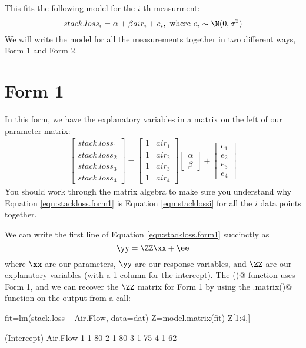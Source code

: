 This fits the following model for the $i$-th measurment:
\begin{equation}\label{eqn:stacklossi}
stack.loss_i = \alpha + \beta air_i + e_i, \text{ where } e_i \sim \N(0,\sigma^2) 
\end{equation}
We will write the model for all the measurements together in two different ways, Form 1 and Form 2.

\section{Form 1}
In this form, we have the explanatory variables in a matrix on the left of our parameter matrix:
\begin{equation}\label{eqn:stackloss.form1}
\begin{gathered}
\begin{bmatrix}stack.loss_1\\stack.loss_2\\stack.loss_3\\stack.loss_4\end{bmatrix}
= 
\begin{bmatrix}1&air_1\\1&air_2\\1&air_3\\1&air_4\end{bmatrix}
\begin{bmatrix}\alpha\\ \beta\end{bmatrix}
+
\begin{bmatrix}e_1\\e_2\\e_3\\e_4\end{bmatrix}
\end{gathered}
\end{equation}
You should work through the matrix algebra to make sure you understand why Equation \ref{eqn:stackloss.form1} is Equation \ref{eqn:stacklossi} for all the $i$ data points together.


We can write the first line of Equation \ref{eqn:stackloss.form1} succinctly as
\begin{equation}
\yy = \ZZ\xx + \ee
\end{equation}
where $\xx$ are our parameters, $\yy$ are our response variables, and $\ZZ$ are our explanatory variables (with a 1 column for the intercept).  The \verb@lm()@ function uses Form 1, and we can recover the $\ZZ$ matrix for Form 1 by using the \verb@model.matrix()@ function on the output from a \verb@lm@ call:
\begin{Schunk}
\begin{Sinput}
 fit=lm(stack.loss ~ Air.Flow, data=dat)
 Z=model.matrix(fit)
 Z[1:4,]
\end{Sinput}
\begin{Soutput}
  (Intercept) Air.Flow
1           1       80
2           1       80
3           1       75
4           1       62
\end{Soutput}
\end{Schunk}

